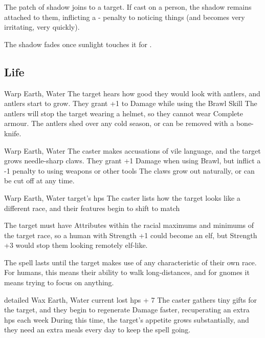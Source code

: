 \begin{multicols}{2}
{    The patch of shadow joins to a target.
    If cast on a person, the shadow remains attached to them, inflicting a - penalty to noticing things (and becomes very irritating, very quickly).

    The shadow fades once sunlight touches it for .}

\subsection{Life}


  {}%
  {Warp}%
  {Earth, Water}%
  {}%
  {The target hears how good they would look with antlers, and antlers start to grow.
  They grant +1 to Damage while using the Brawl Skill}%
  {
  The antlers will stop the target wearing a helmet, so they cannot wear Complete armour.
  The antlers shed over any cold season, or can be removed with a bone-knife.}

  {}%
  {Warp}%
  {Earth, Water}%
  {}%
  {The caster makes accusations of vile language, and the target grows needle-sharp claws.
  They grant +1 Damage when using Brawl, but inflict a -1 penalty to using weapons or other tools}%
  {
  The claws grow out naturally, or can be cut off at any time.}

  {}%
  {Warp}%
  {Earth, Water}%
  {target's \glspl{hp}}%
  {The caster lists how the target looks like a different race, and their features begin to shift to match}%
  {The target must have Attributes within the racial maximums and minimums of the target race, so a human with Strength +1 could become an elf, but Strength +3 would stop them looking remotely elf-like.

  The spell lasts until the target makes use of any characteristic of their own race.
  For humans, this means their ability to walk long-distances, and for gnomes it means trying to focus on anything.}


  {detailed}%
  {Wax}%
  {Earth, Water}%
  {current lost \glspl{hp} + 7}%
  {The caster gathers tiny gifts for the target, and they begin to regenerate Damage faster, recuperating an extra  \glspl{hp} each week}%
  {During this time, the target's appetite grows substantially, and they need an extra  meals every day to keep the spell going.}


\end{multicols}
